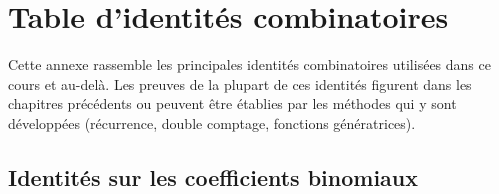 \documentclass[12pt,a4paper,openany]{book}
\theoremstyle{definition}
\theoremstyle{plain}
\theoremstyle{remark}
\begin{document}
\appendix
\chapter{Table d'identités combinatoires}
\label{app:identites}

Cette annexe rassemble les principales identités combinatoires utilisées
dans ce cours et au-delà. Les preuves de la plupart de ces identités
figurent dans les chapitres précédents ou peuvent être établies par les
méthodes qui y sont développées (récurrence, double comptage, fonctions
génératrices).

\section{Identités sur les coefficients binomiaux}
\label{sec:identites-binomiales}
\end{document}
